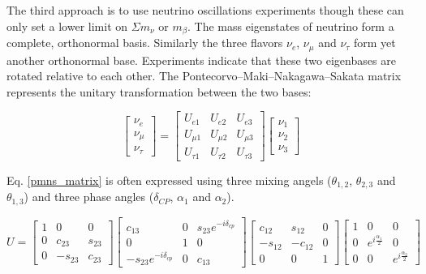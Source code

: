 The third approach is to use neutrino oscillations experiments though these can only set a lower limit on $\Sigma m_\nu$ or $m_\beta$. The mass eigenstates of neutrino form a complete, orthonormal basis. Similarly the three flavors $\nu_e$, $\nu_\mu$ and $\nu_\tau$ form yet another orthonormal base. Experiments indicate that these two eigenbases are rotated relative to each other. The Pontecorvo–Maki–Nakagawa–Sakata matrix represents the unitary transformation between the two bases:

\begin{equation}\label{pmns_matrix}
\begin{bmatrix} \nu_e \\ \nu_\mu \\ \nu_\tau \end{bmatrix} = \begin{bmatrix} U_{e1} & U_{e2} & U_{e3}\\ U_{\mu 1} & U_{\mu 2} & U_{\mu 3} \\ U_{\tau 1} & U_{\tau 2} & U_{\tau 3} \end{bmatrix} \begin{bmatrix} \nu_1 \\ \nu_2 \\ \nu_3 \end{bmatrix}
\end{equation}

Eq. \ref{pmns_matrix} is often expressed using three mixing angels ($\theta_{1,2}$, $\theta_{2,3}$ and $\theta_{1,3}$) and three phase angles ($\delta_{CP}$, $\alpha_1$ and $\alpha_2$).

\begin{equation}\label{pmns_matrix_expanded}
U = \begin{bmatrix} 1 & 0 & 0\\ 0 & c_{23} & s_{23} \\ 0 & -s_{23} & c_{23} \end{bmatrix} \begin{bmatrix} c_{13} & 0 & s_{23}e^{-i\delta_{cp}}\\ 0 & 1 & 0 \\ -s_{23}e^{-i\delta_{cp}} & 0 & c_{13} \end{bmatrix} \begin{bmatrix} c_{12} & s_{12} & 0\\ -s_{12} & -c_{12} & 0 \\ 0 & 0 & 1 \end{bmatrix} \begin{bmatrix} 1 & 0 & 0\\ 0 & e^{i\frac{\alpha_1}{2}} & 0 \\ 0 & 0 & e^{i\frac{\alpha_2}{2}}\end{bmatrix}
\end{equation}

